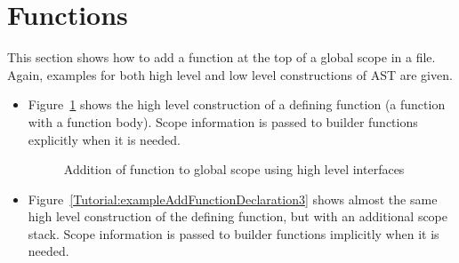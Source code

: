 \clearpage
\section{Functions}
This section shows how to add a function at the top of a global scope in a
file. Again, examples for both high level and low level constructions of AST are given.
\begin{itemize}
\item Figure~\ref{Tutorial:exampleAddFunctionDeclaration2} shows the high
level construction of a defining function (a function  with a function
    body). Scope information is passed to builder functions explicitly when
it is needed.
\begin{figure}[!h]
{\indent
{\mySmallestFontSize
\begin{latexonly}
  
\end{latexonly}

\begin{htmlonly}
   
\end{htmlonly}

}
}
\caption{Addition of function to global scope using high level interfaces}
\label{Tutorial:exampleAddFunctionDeclaration2}
\end{figure}


\item Figure~\ref{Tutorial:exampleAddFunctionDeclaration3} shows almost the
same high level construction of the defining function, but with an
additional scope stack. 
 Scope information is passed to builder functions implicitly when
it is needed.
\begin{figure}[!h]
{\indent
{\mySmallestFontSize
\begin{latexonly}
  
\end{latexonly}

\begin{htmlonly}
   
\end{htmlonly}

}}
\end{figure}
\end{itemize}
